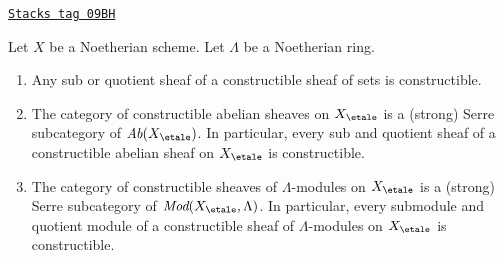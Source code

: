 \begin{proposition}
\label{etale-cohomology-proposition-constructible-over-noetherian}
\href{https://stacks.math.columbia.edu/tag/09BH}{\texttt{Stacks tag 09BH}}

Let $X$ be a Noetherian scheme. Let $\Lambda$ be a Noetherian ring.
\begin{enumerate}
\item Any sub or quotient sheaf of a constructible sheaf of sets
is constructible.
\item The category of constructible abelian sheaves on $X_\etale$ is a
(strong) Serre subcategory of $\textit{Ab}(X_\etale)$. In particular,
every sub and quotient sheaf of a constructible abelian sheaf
on $X_\etale$ is constructible.
\item The category of constructible sheaves of $\Lambda$-modules
on $X_\etale$ is a (strong) Serre subcategory of
$\textit{Mod}(X_\etale, \Lambda)$. In particular, every submodule
and quotient module of a constructible sheaf of $\Lambda$-modules
on $X_\etale$ is constructible.
\end{enumerate}
\end{proposition}

